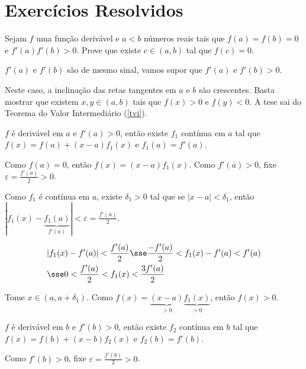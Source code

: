 \documentclass[11pt, oneside, a4paper]{gsm-l}
\begin{document}
\section{Exercícios Resolvidos}

\begin{exer}
Sejam $f$ uma função derivável e $a < b$ n\'umeros reais tais que $f(a) = f(b) = 0$ e $f'(a)f'(b) > 0$. Prove que existe $c \in (a,b)$ tal que $f(c) = 0$.
\end{exer}

\begin{sol}
$f'(a)$ e $f'(b)$ são de mesmo sinal, vamos supor que $f'(a)$ e $f'(b) > 0$.


Neste caso, a inclinação das retas tangentes em $a$ e $b$ são crescentes. Basta mostrar que existem $x,y \in (a,b)$ tais que $f(x) > 0$ e $f(y) < 0$. A tese sai do Teorema do Valor Intermediário (\ref{tvi}).

\begin{sloppypar}
$f$ é derivável em $a$ e $f'(a) > 0$, então existe $f_1$ contínua em $a$ tal que ${f(x) = f(a) + (x - a)f_1(x)}$ e $f_1(a) = f'(a)$.
\end{sloppypar}

Como $f(a) = 0$, então $f(x) = (x - a)f_1(x)$. Como $f'(a) > 0$, fixe $\varepsilon = \frac{f'(a)}{2} > 0$.

Como $f_1$ é contínua em $a$, existe $\delta_1 > 0$ tal que se $|x - a| < \delta_1$, então $\left| {f_1 (x) - \underbrace {f_1 (a)}_{f'(a)}} \right| < \varepsilon  = \frac{{f'(a)}}{2}$.

\[
\begin{gathered}
  |f_1(x) - f'(a)| < \frac{f'(a)}{2} \sse \frac{-f'(a)}{2} < f_1(x) - f'(a) < f'(a) \hfill \\
  \sse 0 < \frac{f'(a)}{2} < f_1(x) < \frac{3f'(a)}{2} \hfill \\ 
\end{gathered} 
\]

Tome $x \in (a,a + \delta_1)$. Como $f(x) = \underbrace{(x - a)}_{>0} \underbrace{f_1(x)}_{>0}$, então $f(x) > 0$.

\begin{sloppypar}
$f$ é derivável em $b$ e $f'(b) > 0$, então existe $f_2$ contínua em $b$ tal que ${f(x) = f(b) + (x - b)f_2(x)}$ e $f_2(b) = f'(b)$.
\end{sloppypar}

Como $f'(b) > 0$, fixe $\varepsilon = \frac{f'(b)}{2} > 0$.


\end{sol}
\end{document}

